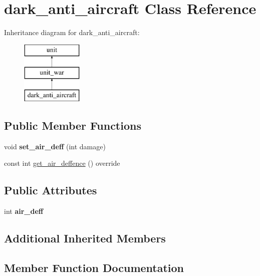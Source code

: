 \hypertarget{classdark__anti__aircraft}{}\section{dark\+\_\+anti\+\_\+aircraft Class Reference}
\label{classdark__anti__aircraft}
Inheritance diagram for dark\+\_\+anti\+\_\+aircraft\+:\begin{figure}[H]
\begin{center}
\leavevmode
\includegraphics[height=3.000000cm]{classdark__anti__aircraft}
\end{center}
\end{figure}
\subsection*{Public Member Functions}
\begin{DoxyCompactItemize}
\item 
\mbox{\label{classdark__anti__aircraft_a0bb8cd743c83023a2fbcd0e2c4d42cda}} 
void {\bfseries set\+\_\+air\+\_\+deff} (int damage)
\item 
const int \mbox{\hyperlink{classdark__anti__aircraft_a572ddd2093ff6e8479392b788a5be231}{get\+\_\+air\+\_\+deffence}} () override
\end{DoxyCompactItemize}
\subsection*{Public Attributes}
\begin{DoxyCompactItemize}
\item 
\mbox{\label{classdark__anti__aircraft_a1030e667c38840cbc2f5473c5d5a0a23}} 
int {\bfseries air\+\_\+deff}
\end{DoxyCompactItemize}
\subsection*{Additional Inherited Members}


\subsection{Member Function Documentation}
\mbox{\label{classdark__anti__aircraft_a572ddd2093ff6e8479392b788a5be231}} 
